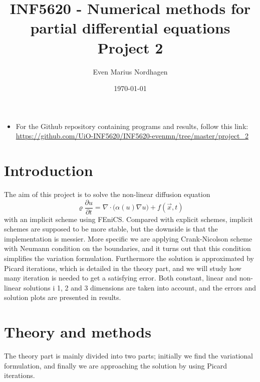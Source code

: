 \documentclass[norsk,a4paper,12pt]{article}
\title{INF5620 - Numerical methods for partial differential equations\\\vspace{2mm} \Large{Project 2}}
\author{\large Even Marius Nordhagen}
\date\today
\begin{document}
\maketitle

\begin{itemize}
\item For the Github repository containing programs and results, follow this link: 
\url{https://github.com/UiO-INF5620/INF5620-evenmn/tree/master/project_2}
\end{itemize}

\section{Introduction}
The aim of this project is to solve the non-linear diffusion equation
\begin{equation}
\varrho \frac{\partial u}{\partial t}=\nabla\cdot\Big(\alpha(u)\nabla u\Big) + f(\vec{x},t)
\end{equation}
with an implicit scheme using FEniCS. Compared with explicit schemes, implicit schemes are supposed to be more stable, but the downside is that the implementation is messier. More specific we are applying Crank-Nicolson scheme with Neumann condition on the boundaries, and it turns out that this condition simplifies the variation formulation. Furthermore the solution is approximated by Picard iterations, which is detailed in the theory part, and we will study how many iteration is needed to get a satisfying error. Both constant, linear and non-linear solutions i 1, 2 and 3 dimensions are taken into account, and the errors and solution plots are presented in results. 
\newpage
\section{Theory and methods}
The theory part is mainly divided into two parts; initially we find the variational formulation, and finally we are approaching the solution by using Picard iterations.
\end{document}

